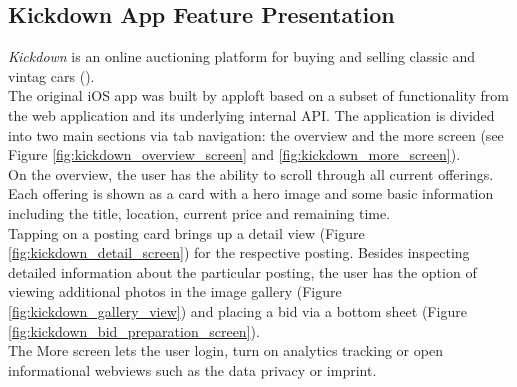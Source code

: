 \subsection{Kickdown App Feature Presentation} \label{section:kickdown_feature_presentation}
\textit{Kickdown} is an online auctioning platform for buying and selling classic and vintag cars (\cite{Kickdown2021}).\\
The original iOS app was built by apploft based on a subset of functionality from the web application and its underlying internal API.
The application is divided into two main sections via tab navigation: the overview and the more screen (see Figure \ref{fig:kickdown_overview_screen} and \ref{fig:kickdown_more_screen}).\\
On the overview, the user has the ability to scroll through all current offerings. Each offering is shown as a card with a hero image 
and some basic information including the title, location, current price and remaining time.\\
Tapping on a posting card brings up a detail view (Figure \ref{fig:kickdown_detail_screen}) for the respective posting.
Besides inspecting detailed information about the particular posting, the user has the option of viewing additional photos in the image gallery (Figure \ref{fig:kickdown_gallery_view}) and placing a bid via a bottom sheet (Figure \ref{fig:kickdown_bid_preparation_screen}).\\
The More screen lets the user login, turn on analytics tracking or open informational webviews such as the data privacy or imprint.

